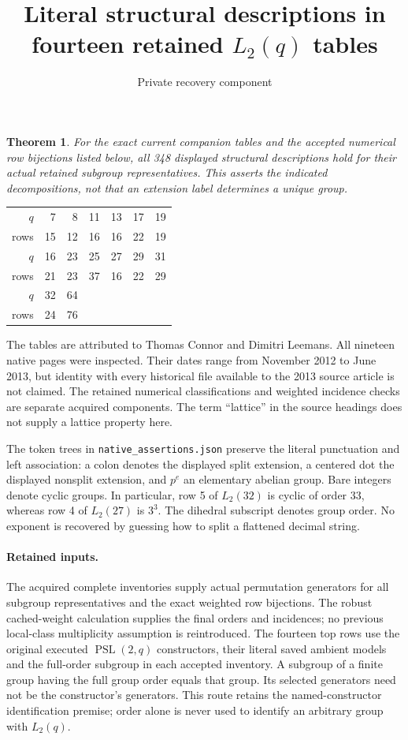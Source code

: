 \documentclass[11pt]{article}
\title{Literal structural descriptions in fourteen retained $L_2(q)$ tables}
\author{Private recovery component}\date{}
\newtheorem{theorem}{Theorem}\newtheorem{lemma}{Lemma}
\begin{document}
\maketitle
\begin{theorem}
For the exact current companion tables and the accepted numerical row
bijections listed below, all 348 displayed structural descriptions hold for
their actual retained subgroup representatives. This asserts the indicated
decompositions, not that an extension label determines a unique group.
\end{theorem}
\begin{center}\begin{tabular}{rrrrrrr}\toprule
$q$&7&8&11&13&17&19\\
rows&15&12&16&16&22&19\\\midrule
$q$&16&23&25&27&29&31\\
rows&21&23&37&16&22&29\\\midrule
$q$&32&64&&&&\\
rows&24&76&&&&\\\bottomrule
\end{tabular}\end{center}
The tables are attributed to Thomas Connor and Dimitri Leemans. All nineteen
native pages were inspected. Their dates range from November 2012 to June
2013, but identity with every historical file available to the 2013 source
article is not claimed. The retained numerical classifications and weighted
incidence checks are separate acquired components. The term ``lattice'' in
the source headings does not supply a lattice property here.

The token trees in \texttt{native\_assertions.json} preserve the literal
punctuation and left association: a colon denotes the displayed split
extension, a centered dot the displayed nonsplit extension, and $p^e$ an
elementary abelian group. Bare integers denote cyclic groups. In particular,
row 5 of $L_2(32)$ is cyclic of order 33, whereas row 4 of $L_2(27)$ is
$3^3$. The dihedral subscript denotes group order. No exponent is recovered
by guessing how to split a flattened decimal string.

\paragraph{Retained inputs.}
The acquired complete inventories supply actual permutation generators for
all subgroup representatives and the exact weighted row bijections. The
robust cached-weight calculation supplies the final orders and incidences;
no previous local-class multiplicity assumption is reintroduced. The fourteen
top rows use the original executed $\operatorname{PSL}(2,q)$ constructors,
their literal saved ambient models and the full-order subgroup in each
accepted inventory. A subgroup of a finite group having the full group order
equals that group. Its selected generators need not be the constructor's
generators. This route retains the named-constructor identification premise;
order alone is never used to identify an arbitrary group with $L_2(q)$.
\end{document}
